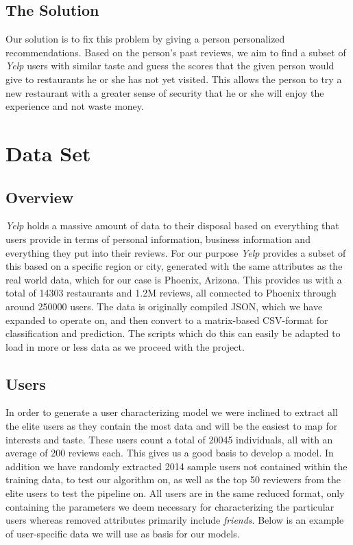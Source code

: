\documentclass[10pt,twocolumn,letterpaper]{article}
\begin{document}
\subsection{The Solution}
Our solution is to fix this problem by giving a person personalized recommendations. Based on the person's past reviews, we aim to find a subset of \textit{Yelp} users with similar taste and guess the scores that the given person would give to restaurants he or she has not yet visited. This allows the person to try a new restaurant with a greater sense of security that he or she will enjoy the experience and not waste money. \cite{Alpher02}

\section{Data Set}
\subsection{Overview}
\textit{Yelp} holds a massive amount of data to their disposal based on everything that users provide in terms of personal information, business information and everything they put into their reviews. For our purpose \textit{Yelp} provides a subset of this based on a specific region or city, generated with the same attributes as the real world data, which for our case is Phoenix, Arizona. This provides us with a total of 14303 restaurants and 1.2M reviews, all connected to Phoenix through around 250000 users. The data is originally compiled JSON, which we have expanded to operate on, and then convert to a matrix-based CSV-format for classification and prediction. The scripts which do this can easily be adapted to load in more or less data as we proceed with the project.

\subsection{Users}
In order to generate a user characterizing model we were inclined to extract all the elite users as they contain the most data and will be the easiest to map for interests and taste. These users count a total of 20045 individuals, all with an average of 200 reviews each. This gives us a good basis to develop a model. In addition we have randomly extracted 2014 sample users not contained within the training data, to test our algorithm on, as well as the top 50 reviewers from the elite users to test the pipeline on. All users are in the same reduced format, only containing the parameters we deem necessary for characterizing the particular users whereas removed attributes primarily include \textit{friends}. Below is an example of user-specific data we will use as basis for our models.
\end{document}
